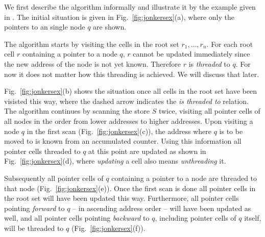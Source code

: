 \documentclass[10pt,a4paper,final,twocolumn]{article}
\begin{document}
\begin{figure*}[htb]
  \caption{Example run of Jonkers' algorithm}
  \label{fig:jonkersex}
\end{figure*}

We first describe the algorithm informally and illustrate it by the example given in \cite{Jonkers79}.
The initial situation is given in Fig.~\ref{fig:jonkersex}(a), where only the pointers to an
single node $q$ are shown.

The algorithm starts by visiting the cells in the root set $r_1,\ldots,r_n$. For each root cell $r$
containing a pointer to a node $q$, $r$ cannot be updated immediately since the new address of
the node is not yet known. Therefore $r$ is \emph{threaded} to $q$. For now it does not matter how
this threading is achieved. We will discuss that later.

Fig.~\ref{fig:jonkersex}(b) shows the situation once all cells in the root set have been visisted
this way, where the dashed arrow indicates the \emph{is threaded to} relation. The algorithm continues
by scanning the store $S$ twice, visiting all pointer cells of all nodes in the order from lower
addresses to higher addresses. Upon visiting a node $q$ in the first scan (Fig.~\ref{fig:jonkersex}(c)),
the address where $q$ is to be moved to is known from an accumulated counter. Using this information
all pointer cells threaded to $q$ at this point are updated as shown in Fig.~\ref{fig:jonkersex}(d),
where \emph{updating} a cell also means \emph{unthreading} it.

Subsequently all pointer cells of $q$ containing a pointer to a node are threaded to that node
(Fig.~\ref{fig:jonkersex}(e)). Once the first scan is done all pointer cells in the root set
will have been updated this way. Furthermore, all pointer cells pointing \emph{forward} to
$q$ -- in ascending address order -- will have been updated as well, and all pointer cells
pointing \emph{backward} to $q$, including pointer cells of $q$ itself, will be threaded to
$q$ (Fig.~\ref{fig:jonkersex}(f)).
\end{document}
